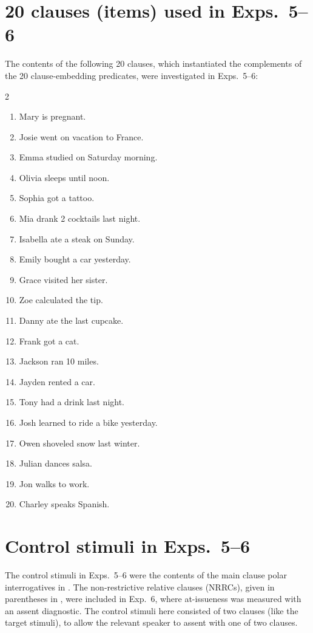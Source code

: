\documentclass[times,linguex]{glossa}
\begin{document}
\section{20 clauses (items) used in Exps.~5--6}\label{supp:a-clauses}
The contents of the following 20 clauses, which instantiated the complements of the 20 clause-embedding predicates, were investigated in Exps.~5--6:

\begin{multicols}{2}
  \begin{enumerate}%
    \item Mary is pregnant.
    \item Josie went on vacation to France.
    \item Emma studied on Saturday morning.
    \item Olivia sleeps until noon.
    \item Sophia got a tattoo.
    \item Mia drank 2 cocktails last night.
    \item Isabella ate a steak on Sunday.
    \item Emily bought a car yesterday.
    \item Grace visited her sister.
    \item Zoe calculated the tip.
    
    \item  Danny ate the last cupcake.
    \item  Frank got a cat.
    \item  Jackson ran 10 miles.
    \item  Jayden rented a car.
    \item  Tony had a drink last night.
    \item  Josh learned to ride a bike yesterday.
    \item  Owen shoveled snow last winter.
    \item  Julian dances salsa.
    \item  Jon walks to work.
    \item  Charley speaks Spanish.
    
  \end{enumerate}
\end{multicols}

\section{Control stimuli in Exps.~5--6}\label{supp:control56}
The control stimuli in Exps.~5--6 were the contents of the main clause polar interrogatives in \Next. The non-restrictive relative clauses (NRRCs), given in parentheses in \Next, were included in Exp.~6, where at-issueness was measured with an assent diagnostic. The control stimuli here consisted of two clauses (like the target stimuli), to allow the relevant speaker to assent with one of two clauses.
\end{document}
